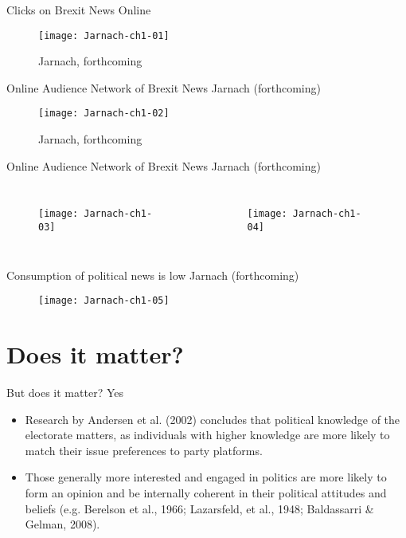 \documentclass{beamer}
\begin{document}
\begin{frame}{Clicks on Brexit News Online}
    \begin{figure}
        \centering
        \texttt{[image: Jarnach-ch1-01]}
        \caption{Jarnach, forthcoming}
        \label{fig:my_label}
    \end{figure}
\end{frame}

\begin{frame}{Online Audience Network of Brexit News}
\small Jarnach (forthcoming)
    \begin{figure}
        \centering
        \texttt{[image: Jarnach-ch1-02]}
        \caption{Jarnach, forthcoming}
        \label{fig:my_label}
    \end{figure}
\end{frame}

\begin{frame}{Online Audience Network of Brexit News}
\small Jarnach (forthcoming)
    \begin{columns}
            \begin{figure}
            \centering
            \texttt{[image: Jarnach-ch1-03]}
            \end{figure}
   
            \begin{figure}
                \centering
                \texttt{[image: Jarnach-ch1-04]}
            \end{figure}
     \end{columns}
\end{frame}


\begin{frame}{Consumption of political news is low}
\small Jarnach (forthcoming)
            \begin{figure}
                \centering
                \texttt{[image: Jarnach-ch1-05]}
            \end{figure}
\end{frame}




\section{Does it matter? }
\begin{frame}{But does it matter? Yes}
\begin{itemize}
    \item Research by Andersen et al. (2002) concludes that political knowledge of the electorate matters, as individuals with higher knowledge are more likely to match their issue preferences to party platforms.
    \item Those generally more interested and engaged in politics are more likely to form an opinion and be internally coherent in their political attitudes and beliefs (e.g. Berelson et al., 1966; Lazarsfeld, et al., 1948; Baldassarri & Gelman, 2008).
\end{itemize}
\end{frame}
\end{document}
